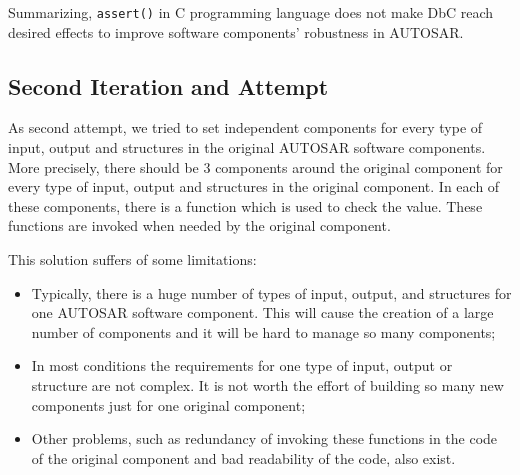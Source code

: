 Summarizing, \texttt{assert()} in C programming language does not make DbC reach desired effects to improve software components' robustness in AUTOSAR.


\subsection{Second Iteration and Attempt}
As second attempt, we tried to set independent components for every type of input, output and structures in the original AUTOSAR software components. %
More precisely, there should be 3 components around the original component for every type of input, output and structures in the original component. In each of these components, there is a function which is used to check the value. %
These functions are invoked when needed by the original component. 

This solution suffers of some limitations: 
\begin{itemize}
\item Typically, there is a huge number of types of input, output, and structures for one AUTOSAR software component. This will cause the creation of a large number of components and it will be hard to manage so many components;
\item In most conditions the requirements for one type of input, output or structure are not complex. It is not worth the effort of building so many new components just for one original component;
\item Other problems, such as redundancy of invoking these functions in the code of the original component and bad readability of the code, also exist.
\end{itemize}

